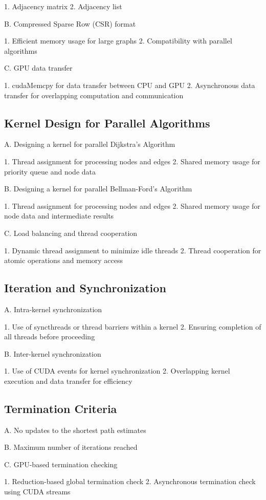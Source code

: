 \documentclass{article}
\begin{document}
1. Adjacency matrix
2. Adjacency list

B. Compressed Sparse Row (CSR) format

1. Efficient memory usage for large graphs
2. Compatibility with parallel algorithms

C. GPU data transfer

1. cudaMemcpy for data transfer between CPU and GPU
2. Asynchronous data transfer for overlapping computation and communication

\subsection{Kernel Design for Parallel Algorithms}
A. Designing a kernel for parallel Dijkstra's Algorithm

1. Thread assignment for processing nodes and edges
2. Shared memory usage for priority queue and node data

B. Designing a kernel for parallel Bellman-Ford's Algorithm

1. Thread assignment for processing nodes and edges
2. Shared memory usage for node data and intermediate results

C. Load balancing and thread cooperation

1. Dynamic thread assignment to minimize idle threads
2. Thread cooperation for atomic operations and memory access

\subsection{Iteration and Synchronization}
A. Intra-kernel synchronization

1. Use of syncthreads or thread barriers within a kernel
2. Ensuring completion of all threads before proceeding

B. Inter-kernel synchronization

1. Use of CUDA events for kernel synchronization
2. Overlapping kernel execution and data transfer for efficiency

\subsection{Termination Criteria}
A. No updates to the shortest path estimates

B. Maximum number of iterations reached

C. GPU-based termination checking

1. Reduction-based global termination check
2. Asynchronous termination check using CUDA streams
\end{document}
